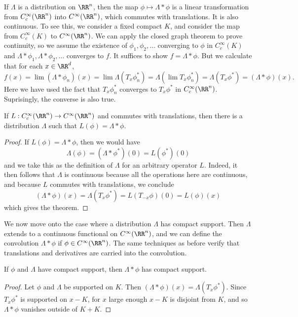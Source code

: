 If $\Lambda$ is a distribution on $\RR^n$, then the map $\phi \mapsto \Lambda * \phi$ is a linear transformation from $C_c^\infty(\RR^n)$ into $C^\infty(\RR^n)$, which commutes with translations. It is also continuous. To see this, we consider a fixed compact $K$, and consider the map from $C_c^\infty(K)$ to $C^\infty(\RR^n)$. We can apply the closed graph theorem to prove continuity, so we assume the existence of $\phi_1, \phi_2, \dots$ converging to $\phi$ in $C_c^\infty(K)$ and $\Lambda * \phi_1, \Lambda * \phi_2, \dots$ converges to $f$. It suffices to show $f = \Lambda * \phi$. But we calculate that for each $x \in \RR^d$,
%
\[ f(x) = \lim (\Lambda * \phi_n)(x) = \lim \Lambda(T_x \phi^*_n) = \Lambda (\lim T_x \phi^*_n) = \Lambda(T_x \phi^*) = (\Lambda * \phi)(x). \]
%
Here we have used the fact that $T_x \phi_n^*$ converges to $T_x \phi^*$ in $C_c^\infty(\RR^n)$. Suprisingly, the converse is also true.

\begin{theorem}
    If $L: C_c^\infty(\RR^n) \to C^\infty(\RR^n)$ and commutes with translations, then there is a distribution $\Lambda$ such that $L(\phi) = \Lambda * \phi$.
\end{theorem}
\begin{proof}
    If $L(\phi) = \Lambda * \phi$, then we would have
    \[ \Lambda(\phi) = (\Lambda * \phi^*)(0) = L(\phi^*)(0) \]
    and we take this as the definition of $\Lambda$ for an arbitrary operator $L$. Indeed, it then follows that $\Lambda$ is continuous because all the operations here are continuous, and because $L$ commutes with translations, we conclude
    \[ (\Lambda * \phi)(x) = \Lambda(T_x \phi^*) = L(T_{-x} \phi)(0) = L(\phi)(x) \]
    which gives the theorem.
\end{proof}

We now move onto the case where a distribution $\Lambda$ has compact support. Then $\Lambda$ extends to a continuous functional on $C^\infty(\RR^n)$, and we can define the convolution $\Lambda * \phi$ if $\phi \in C^\infty(\RR^n)$. The same techniques as before verify that translations and derivatives are carried into the convolution.

\begin{theorem}
    If $\phi$ and $\Lambda$ have compact support, then $\Lambda * \phi$ has compact support.
\end{theorem}
\begin{proof}
    Let $\phi$ and $\Lambda$ be supported on $K$. Then $(\Lambda * \phi)(x) = \Lambda(T_x \phi^*)$. Since $T_x \phi^*$ is supported on $x - K$, for $x$ large enough $x-K$ is disjoint from $K$, and so $\Lambda * \phi$ vanishes outside of $K + K$.
\end{proof}

